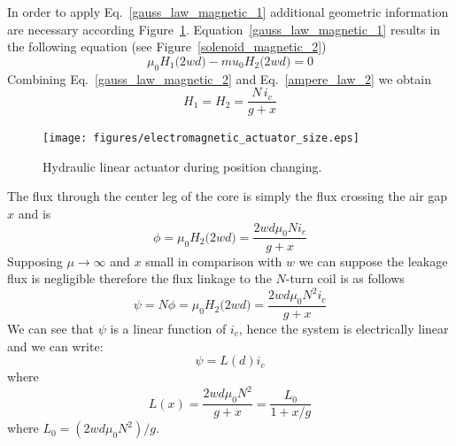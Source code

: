 \documentclass[11pt,a4paper,oneside]{book}
\numberwithin{equation}{section}
\theoremstyle{it}
\theoremstyle{definition}
\begin{document}
In order to apply Eq.~\eqref{gauss_law_magnetic_1} additional geometric information are necessary according Figure~\ref{solenoid_mech_2}. Equation~\ref{gauss_law_magnetic_1} results in the following equation (see Figure~\ref{solenoid_magnetic_2})
\begin{equation}\label{gauss_law_magnetic_2}
	\mu_0H_1\Big(2wd\Big)-mu_0H_2\Big(2wd\Big)=0
\end{equation}
Combining Eq.~\eqref{gauss_law_magnetic_2} and Eq.~\eqref{ampere_law_2} we obtain
\begin{equation*}\label{}
	H_1=H_2=\frac{N\,i_c}{g+x}
\end{equation*}
\begin{figure}[H]
	\centering
	\texttt{[image: figures/electromagnetic\_actuator\_size.eps]}
	\captionsetup{width=0.75\textwidth}		
	\caption{Hydraulic linear actuator during position changing.}
	\label{solenoid_mech_2}
\end{figure}
The flux through the center leg of the core is simply the flux crossing the air gap $x$ and is
\begin{equation}\label{flow_1}
	\phi=\mu_0H_2\Big(2wd\Big)=\frac{2wd\mu_0Ni_c}{g+x}
\end{equation}
Supposing $\mu\rightarrow\infty$ and $x$ small in comparison with $w$ we can suppose the leakage flux is negligible therefore the flux linkage to the $N$-turn coil is as follows
\begin{equation}\label{flow_2}
	\psi=N\phi=\mu_0H_2\Big(2wd\Big)=\frac{2wd\mu_0N^2i_c}{g+x}
\end{equation}
We can see that $\psi$ is a linear function of $i_c$, hence the system is electrically linear and we can write:
\begin{equation*}\label{}
	\psi = L(d)i_c
\end{equation*}
where
\begin{equation}\label{inductance_solenoid}
	L(x) = \frac{2wd\mu_0N^2}{g+x} = \frac{L_0}{1+x/g}
\end{equation}
where $L_0=(2wd\mu_0N^2)/g$. 
\end{document}
